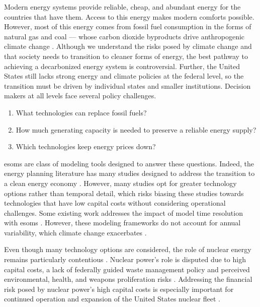 Modern energy systems provide reliable, cheap, and abundant energy for the
countries that have them. Access to this energy makes modern comforts possible. However,
most of this energy comes from fossil fuel consumption in the forms of natural gas
and coal --- whose carbon dioxide byproducts drive anthropogenic climate change
\cite{eia_frequently_2022}. Although we understand the risks posed by climate
change and that society needs to transition to cleaner forms of energy, the best
pathway to achieving a decarbonized energy system is controversial. Further, the
United States still lacks strong energy and climate policies at the federal level,
so the transition must be driven by individual states and smaller institutions.
Decision makers at all levels face several policy challenges.
\begin{enumerate}
  \item What technologies can replace fossil fuels?
  \item How much generating capacity is needed to preserve a reliable energy supply?
  \item Which technologies keep energy prices down?
\end{enumerate}

\glspl{esom} are class of modeling tools designed to answer these questions. Indeed,
the energy planning literature has many studies designed to address the transition
to a clean energy economy \cite{fattahi_systemic_2020,yue_review_2018,aryanpur_review_2021}.
However, many studies opt for greater technology options rather than temporal detail,
which risks biasing these studies towards technologies that have low capital costs without
considering operational challenges. Some existing work addresses the impact
of model time resolution with \glspl{esom} \cite{poncelet_impact_2016,
kotzur_impact_2018}. However, these modeling frameworks do not account for annual
variability, which climate change exacerbates \cite{van_der_wiel_contribution_2021}.

Even though many technology options are considered, the role of nuclear energy
remains particularly contentious \cite{lehtveer_how_2015,clemmer_nuclear_2018,
petti_future_2018}.
Nuclear power's role is disputed due to high capital costs, a lack of federally
guided waste management policy and perceived environmental, health, and weapons
proliferation risks \cite{clemmer_nuclear_2018,petti_future_2018}. Addressing
the financial risk posed by nuclear power's high capital costs is especially
important for continued operation and expansion of the United States nuclear fleet
\cite{petti_future_2018, lehtveer_how_2015}.

